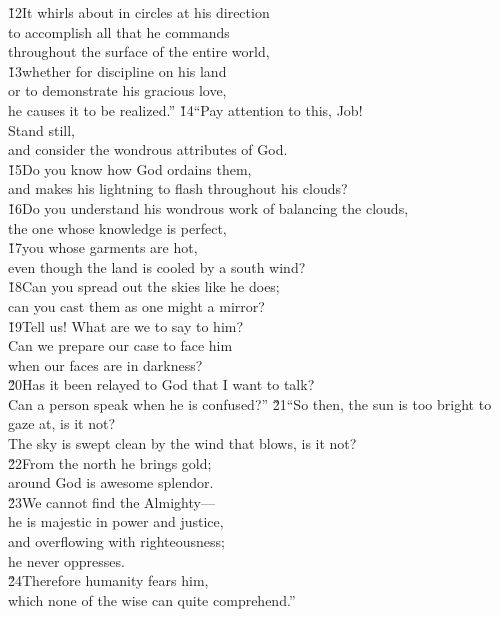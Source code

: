 \begin{poetry}
\poeml \v{12}It whirls about in circles at his direction \\
\poemll    to accomplish all that he commands \\
\poemlll       throughout the surface of the entire world, \\
\poeml \v{13}whether for discipline on his land \\
\poemll    or to demonstrate his gracious love, \\
\poemlll       he causes it to be realized.''
\poeml \v{14}``Pay attention to this, Job! \\
\poemll    Stand still, \\
\poemlll       and consider the wondrous attributes of God. \\
\poeml \v{15}Do you know how God ordains them, \\
\poemll    and makes his lightning to flash throughout his clouds? \\
\poeml \v{16}Do you understand his wondrous work of balancing the clouds, \\
\poemll    the one whose knowledge is perfect, \\
\poeml \v{17}you whose garments are hot, \\
\poemll    even though the land is cooled by a south wind? \\
\poeml \v{18}Can you spread out the skies like he does; \\
\poemll    can you cast them as one might a mirror? \\
\poeml \v{19}Tell us! What are we to say to him? \\
\poemll    Can we prepare our case to face him \\
\poemlll       when our faces are in darkness? \\
\poeml \v{20}Has it been relayed to God that I want to talk? \\
\poemll    Can a person speak when he is confused?''
\poeml \v{21}``So then, the sun is too bright to gaze at, is it not? \\
\poemll    The sky is swept clean by the wind that blows, is it not? \\
\poeml \v{22}From the north he brings gold; \\
\poemll    around God is awesome splendor. \\
\poeml \v{23}We cannot find the Almighty--- \\
\poemll    he is majestic in power and justice, \\
\poeml and overflowing with righteousness; \\
\poemll    he never oppresses. \\
\poeml \v{24}Therefore humanity fears him, \\
\poemll    which none of the wise can quite comprehend.''
\end{poetry}

